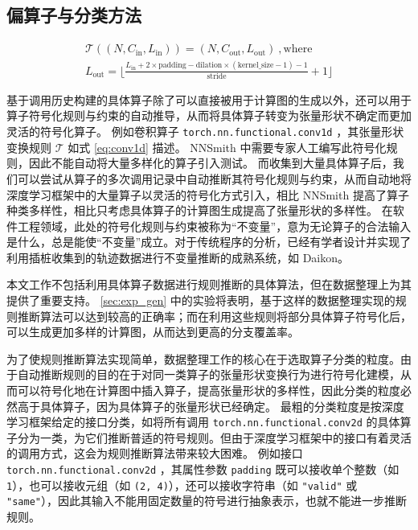 \subsection{偏算子与分类方法}
\label{sec:partialop}

\begin{equation}
\label{eq:conv1d}
\begin{gathered}
\mathcal{T}((N, C_\text{in}, L_\text{in})) = 
(N, C_\text{out}, L_\text{out}) ~, \text{where} \\
L_\text{out} =
\lfloor \frac{L_\text{in} + 2 \times \text{padding} - \text{dilation} \times (\text{kernel\_size} - 1) - 1}{\text{stride}} + 1 \rfloor
\end{gathered}
\end{equation}


基于调用历史构建的具体算子除了可以直接被用于计算图的生成以外，还可以用于算子符号化规则与约束的自动推导，从而将具体算子转变为张量形状不确定而更加灵活的符号化算子。
例如卷积算子 \texttt{torch.nn.functional.conv1d} ，其张量形状变换规则 $\mathcal{T}$ 如式 \eqref{eq:conv1d} 描述\cite{torch_conv1d}。
NNSmith 中需要专家人工编写此符号化规则，因此不能自动将大量多样化的算子引入测试。
而收集到大量具体算子后，我们可以尝试从算子的多次调用记录中自动推断其符号化规则与约束，从而自动地将深度学习框架中的大量算子以灵活的符号化方式引入，相比 NNSmith 提高了算子种类多样性，相比只考虑具体算子的计算图生成提高了张量形状的多样性。
在软件工程领域，此处的符号化规则与约束被称为“不变量”，意为无论算子的合法输入是什么，总是能使“不变量”成立。对于传统程序的分析，已经有学者设计并实现了利用插桩收集到的轨迹数据进行不变量推断的成熟系统，如 Daikon\cite{daikon}。

本文工作不包括利用具体算子数据进行规则推断的具体算法，但在数据整理上为其提供了重要支持。 \ref{sec:exp_gen} 中的实验将表明，基于这样的数据整理实现的规则推断算法可以达到较高的正确率；而在利用这些规则将部分具体算子符号化后，可以生成更加多样的计算图，从而达到更高的分支覆盖率。

为了使规则推断算法实现简单，数据整理工作的核心在于选取算子分类的粒度。由于自动推断规则的目的在于对同一类算子的张量形状变换行为进行符号化建模，从而可以符号化地在计算图中插入算子，提高张量形状的多样性，因此分类的粒度必然高于具体算子，因为具体算子的张量形状已经确定。
最粗的分类粒度是按深度学习框架给定的接口分类，如将所有调用 \texttt{torch.nn.functional.conv2d} 的具体算子分为一类，为它们推断普适的符号规则。但由于深度学习框架中的接口有着灵活的调用方式，这会为规则推断算法带来较大困难。
例如接口 \texttt{torch.nn.functional.conv2d} \cite{torch_f_conv2d}，其属性参数 \texttt{padding} 既可以接收单个整数（如 \texttt{1}），也可以接收元组（如 \texttt{(2, 4)}），还可以接收字符串（如 \texttt{"valid"} 或 \texttt{"same"}），因此其输入不能用固定数量的符号进行抽象表示，也就不能进一步推断规则。

